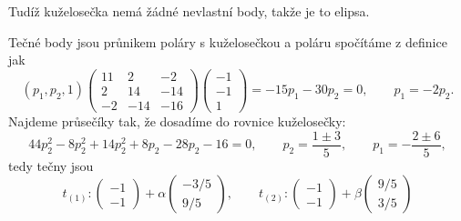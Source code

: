 \documentclass[12pt]{article}                   %
\begin{document}
\begin{priklad}[10.6]
\begin{reseni}
		Tudíž kuželosečka nemá žádné nevlastní body, takže je to elipsa.

		Tečné body jsou průnikem poláry s kuželosečkou a poláru spočítáme z definice jak
		$$ (p_1, p_2, 1) \begin{pmatrix} 11 & 2 & -2 \\ 2 & 14 & -14 \\ -2 & -14 & -16 \end{pmatrix} \begin{pmatrix} -1 \\ -1 \\ 1 \end{pmatrix} = -15p_1 -30p_2 = 0, \qquad p_1 = -2p_2. $$
		Najdeme průsečíky tak, že dosadíme do rovnice kuželosečky:
		$$ 44p_2^2 - 8p_2^2 + 14p_2^2 + 8p_2 - 28p_2 - 16 = 0, \qquad p_2 = \frac{1 ± 3}{5}, \qquad p_1 = -\frac{2 ± 6}{5}, $$
		tedy tečny jsou
		$$ t_{(1)}: \begin{pmatrix} -1 \\ -1 \end{pmatrix} + \alpha \begin{pmatrix} -3 / 5 \\ 9 / 5 \end{pmatrix}, \qquad t_{(2)}: \begin{pmatrix} -1 \\ -1 \end{pmatrix} + \beta \begin{pmatrix} 9 / 5 \\ 3 / 5 \end{pmatrix} $$
	\end{reseni}


\end{priklad}
\end{document}
